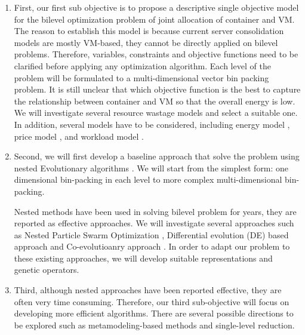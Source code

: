\begin{enumerate}
	\item First, our first sub objective is to propose a descriptive single objective model for the bilevel optimization problem of joint allocation of container and VM. The reason to establish this model is because current server consolidation models are mostly VM-based, they cannot be directly applied on bilevel problems. Therefore, variables, constraints and objective functions need to be clarified before applying any optimization algorithm.
	Each level of the problem will be formulated to a multi-dimensional vector bin packing problem. It is still unclear that which objective function is the best to capture the relationship between container and VM so that the overall energy is low. We will investigate several resource wastage models \cite{Ferdaus:2014ep, Xu:2010df, Gao:2013gg} and select a suitable one. In addition, several models have to be considered, including energy model \cite{Dayarathna:2016ua}, price model \cite{AlRoomi:2013te}, and workload model \cite{Magalhaes:2015ep}.
		
	\item Second, we will first develop a baseline approach that solve the problem using nested Evolutionary algorithms \cite{Sinha:2017et}. We will start from the simplest form: one dimensional bin-packing in each level to more complex multi-dimensional bin-packing.

	Nested methods have been used in solving bilevel problem for years, they are reported as effective approaches. We will investigate several approaches such as Nested Particle Swarm Optimization \cite{Li:2006br}, Differential evolution (DE) based approach \cite{Angelo:2013ee, Zhu:2006in} and Co-evolutioanry approach \cite{Legillon:2012dd}. In order to adapt our problem to these existing approaches, we will develop suitable representations and genetic operators.

	\item Third, although nested approaches have been reported effective, they are often very time consuming. Therefore, our third sub-objective will focus on developing more efficient algorithms. There are several possible directions to be explored such as metamodeling-based methods \cite{Wang:2007em} and single-level reduction. 
\end{enumerate}
